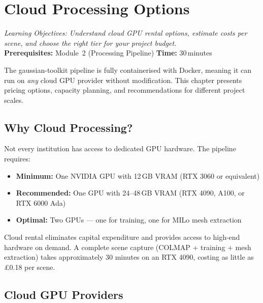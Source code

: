 \chapter{Cloud Processing Options}
\label{ch:cloud}

\begin{center}
\textit{Learning Objectives: Understand cloud GPU rental options, estimate costs per scene, and choose the right tier for your project budget.}\\[0.5em]
\textbf{Prerequisites:} Module~2 (Processing Pipeline) \hfill \textbf{Time:} 30\,minutes
\end{center}

\vspace{1em}

The gaussian-toolkit pipeline is fully containerised with Docker, meaning it can run on \emph{any} cloud GPU provider without modification. This chapter presents pricing options, capacity planning, and recommendations for different project scales.

\section{Why Cloud Processing?}

Not every institution has access to dedicated GPU hardware. The pipeline requires:

\begin{itemize}
  \item \textbf{Minimum:} One NVIDIA GPU with 12\,GB VRAM (RTX 3060 or equivalent)
  \item \textbf{Recommended:} One GPU with 24--48\,GB VRAM (RTX 4090, A100, or RTX 6000 Ada)
  \item \textbf{Optimal:} Two GPUs --- one for training, one for MILo mesh extraction
\end{itemize}

Cloud rental eliminates capital expenditure and provides access to high-end hardware on demand. A complete scene capture (COLMAP + training + mesh extraction) takes approximately 30 minutes on an RTX 4090, costing as little as \pounds0.18 per scene.

\section{Cloud GPU Providers}
\label{sec:cloud-providers}

